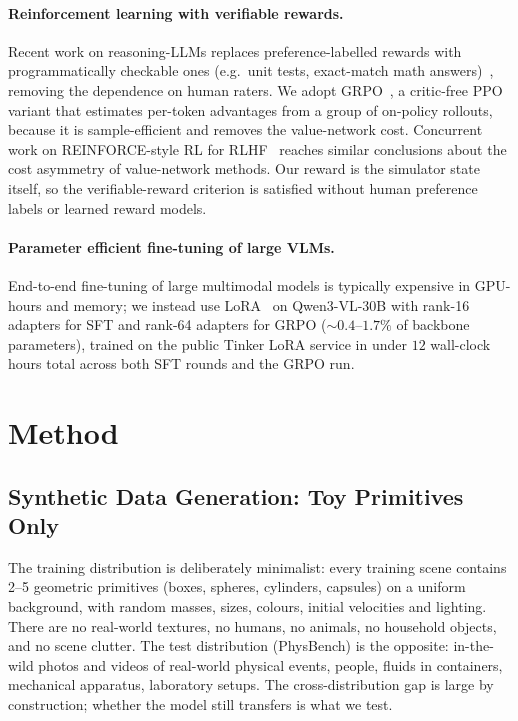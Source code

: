 \documentclass{article}
\begin{document}
\paragraph{Reinforcement learning with verifiable rewards.}
Recent work on reasoning-LLMs replaces preference-labelled rewards
with programmatically checkable ones (e.g.\ unit tests, exact-match
math answers)~\cite{deepseekr12025,deepseekmath2024}, removing the
dependence on human raters. We adopt
GRPO~\cite{deepseekmath2024}, a critic-free PPO~\cite{ppo2017}
variant that estimates per-token advantages from a group of
on-policy rollouts, because it is sample-efficient and removes
the value-network cost. Concurrent work on REINFORCE-style RL for
RLHF~\cite{rloo2024} reaches similar conclusions about the cost
asymmetry of value-network methods. Our reward is the simulator
state itself, so the verifiable-reward criterion is satisfied
without human preference labels or learned reward models.

\paragraph{Parameter efficient fine-tuning of large VLMs.}
End-to-end fine-tuning of large multimodal models is typically
expensive in GPU-hours and memory; we instead use LoRA~\cite{lora2022}
on
Qwen3-VL-30B with rank-16 adapters for SFT and rank-64 adapters
for GRPO ($\sim 0.4$--$1.7\%$ of backbone parameters), trained on
the public Tinker LoRA service in under $12$ wall-clock hours
total across both SFT rounds and the GRPO run.

\section{Method}
\label{sec:method}

\subsection{Synthetic Data Generation: Toy Primitives Only}
\label{sec:data}

The training distribution is deliberately minimalist: every
training scene contains 2--5 geometric primitives (boxes,
spheres, cylinders, capsules) on a uniform background, with random
masses, sizes, colours, initial velocities and lighting. There are no
real-world textures, no humans, no animals, no household objects, and
no scene clutter. The test distribution (PhysBench) is the
opposite: in-the-wild photos and videos of real-world physical
events, people, fluids in containers, mechanical apparatus,
laboratory setups. The cross-distribution gap is large by
construction; whether the model still transfers is what we test.
\end{document}
